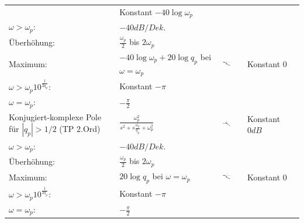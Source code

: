 \begin{landscape}
\begin{longtable}{|p{5cm}|l|ll|ll|}
		\begin{tabular}{ll}
			$\omega < \omega_p$: 	& Konstant $-40 \log \omega_p$ \\
			$\omega > \omega_p$:	& $-40dB/Dek.$ \\
			Überhöhung: 			& $\frac{\omega_p}{2}$ bis $2\omega_p$ \\
			Maximum:				& $-40\log\omega_p + 20 \log q_p$ bei $\omega = \omega_p$			
		\end{tabular} &
		\parbox[c][1cm]{1cm}{\includegraphics[width=1cm]{./images/bode-approx-phase-6.png}} &
		\begin{tabular}{ll}
			$\omega < \frac{\omega_p}{10^{\frac{1}{2q_p}}}$:	& Konstant $0$ \\
			$\omega > \omega_p 10^{\frac{1}{2q_p}}$:			& Konstant $-\pi$ \\
			$\omega = \omega_p$:								& $-\frac{\pi}{2}$
		\end{tabular}
		\\ \hline
		Konjugiert-komplexe Pole \newline
		für $|q_p| > 1/2$ (TP 2.Ord)&
		$\frac{\omega_p^2}{s^2+s\frac{\omega_p}{q_p}+\omega_p^2}$ & 
		\parbox[c][1cm]{1cm}{\includegraphics[width=1cm]{./images/bode-approx-ampl-6.png}} &
		\begin{tabular}{ll}
			$\omega < \omega_p$:	& Konstant $0dB$ \\
			$\omega > \omega_p$:	& $-40dB/Dek.$ \\
			Überhöhung:				& $\frac{\omega_p}{2}$ bis $2 \omega_p$ \\
			Maximum:				& $20 \log q_p$ bei $\omega = \omega_p$
		\end{tabular} &
		\parbox[c][1cm]{1cm}{\includegraphics[width=1cm]{./images/bode-approx-phase-6.png}}	& 
		\begin{tabular}{ll}
			$\omega < \frac{\omega_p}{10^{\frac{1}{2q_p}}}$:	& Konstant $0$ \\
			$\omega > \omega_p 10^{\frac{1}{2q_p}}$:			& Konstant $-\pi$ \\
			$\omega = \omega_p$:								& $-\frac{\pi}{2}$
		\end{tabular}

\end{longtable}
\end{landscape}
